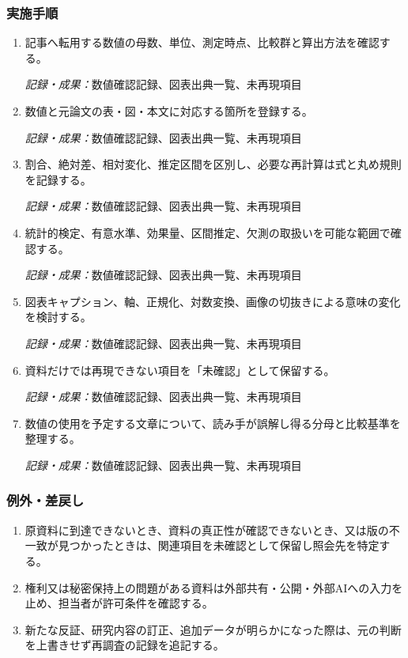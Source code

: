 \documentclass[a4paper,11pt]{article}
\begin{document}
\subsubsection*{実施手順}
\begin{enumerate}[leftmargin=2em,itemsep=0.65em]
\item 記事へ転用する数値の母数、単位、測定時点、比較群と算出方法を確認する。\par\noindent\textit{記録・成果：}数値確認記録、図表出典一覧、未再現項目\nobreak\smallskip
\item 数値と元論文の表・図・本文に対応する箇所を登録する。\par\noindent\textit{記録・成果：}数値確認記録、図表出典一覧、未再現項目\nobreak\smallskip
\item 割合、絶対差、相対変化、推定区間を区別し、必要な再計算は式と丸め規則を記録する。\par\noindent\textit{記録・成果：}数値確認記録、図表出典一覧、未再現項目\nobreak\smallskip
\item 統計的検定、有意水準、効果量、区間推定、欠測の取扱いを可能な範囲で確認する。\par\noindent\textit{記録・成果：}数値確認記録、図表出典一覧、未再現項目\nobreak\smallskip
\item 図表キャプション、軸、正規化、対数変換、画像の切抜きによる意味の変化を検討する。\par\noindent\textit{記録・成果：}数値確認記録、図表出典一覧、未再現項目\nobreak\smallskip
\item 資料だけでは再現できない項目を「未確認」として保留する。\par\noindent\textit{記録・成果：}数値確認記録、図表出典一覧、未再現項目\nobreak\smallskip
\item 数値の使用を予定する文章について、読み手が誤解し得る分母と比較基準を整理する。\par\noindent\textit{記録・成果：}数値確認記録、図表出典一覧、未再現項目\nobreak\smallskip
\end{enumerate}
\subsubsection*{例外・差戻し}
\begin{enumerate}[leftmargin=2em,itemsep=0.35em]
\item 原資料に到達できないとき、資料の真正性が確認できないとき、又は版の不一致が見つかったときは、関連項目を未確認として保留し照会先を特定する。
\item 権利又は秘密保持上の問題がある資料は外部共有・公開・外部AIへの入力を止め、担当者が許可条件を確認する。
\item 新たな反証、研究内容の訂正、追加データが明らかになった際は、元の判断を上書きせず再調査の記録を追記する。
\end{enumerate}
\end{document}
